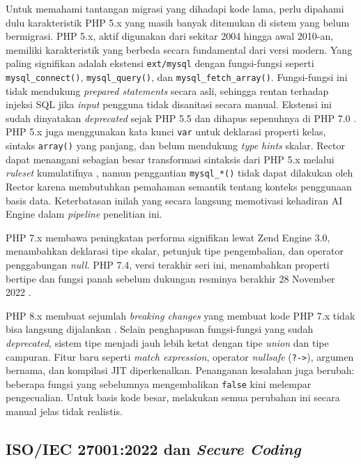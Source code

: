     Untuk memahami tantangan migrasi yang dihadapi kode lama, perlu dipahami dulu karakteristik PHP 5.x yang masih banyak ditemukan di sistem yang belum bermigrasi. PHP 5.x, aktif digunakan dari sekitar 2004 hingga awal 2010-an, memiliki karakteristik yang berbeda secara fundamental dari versi modern. Yang paling signifikan adalah ekstensi \texttt{ext/mysql} dengan fungsi-fungsi seperti \texttt{mysql\_connect()}, \texttt{mysql\_query()}, dan \texttt{mysql\_fetch\_array()}. Fungsi-fungsi ini tidak mendukung \textit{prepared statements} secara asli, sehingga rentan terhadap injeksi SQL jika \textit{input} pengguna tidak disanitasi secara manual. Ekstensi ini sudah dinyatakan \textit{deprecated} sejak PHP 5.5 dan dihapus sepenuhnya di PHP 7.0 \cite{phpgroup2022supported}. PHP 5.x juga menggunakan kata kunci \texttt{var} untuk deklarasi properti kelas, sintaks \texttt{array()} yang panjang, dan belum mendukung \textit{type hints} skalar. Rector dapat menangani sebagian besar transformasi sintaksis dari PHP 5.x melalui \textit{ruleset} kumulatifnya \cite{rector2024}, namun penggantian \texttt{mysql\_*()} tidak dapat dilakukan oleh Rector karena membutuhkan pemahaman semantik tentang konteks penggunaan basis data. Keterbatasan inilah yang secara langsung memotivasi kehadiran AI Engine dalam \textit{pipeline} penelitian ini.

    PHP 7.x membawa peningkatan performa signifikan lewat Zend Engine 3.0, menambahkan deklarasi tipe skalar, petunjuk tipe pengembalian, dan operator penggabungan \textit{null}. PHP 7.4, versi terakhir seri ini, menambahkan properti bertipe dan fungsi panah sebelum dukungan resminya berakhir 28 November 2022 \cite{phpgroup2022supported}.

    PHP 8.x membuat sejumlah \textit{breaking changes} yang membuat kode PHP 7.x tidak bisa langsung dijalankan \cite{phpgroup2022supported}. Selain penghapusan fungsi-fungsi yang sudah \textit{deprecated}, sistem tipe menjadi jauh lebih ketat dengan tipe \textit{union} dan tipe campuran. Fitur baru seperti \textit{match expression}, operator \textit{nullsafe} (\texttt{?->}), argumen bernama, dan kompilasi JIT diperkenalkan. Penanganan kesalahan juga berubah: beberapa fungsi yang sebelumnya mengembalikan \texttt{false} kini melempar pengecualian. Untuk basis kode besar, melakukan semua perubahan ini secara manual jelas tidak realistis.

    \subsection{ISO/IEC 27001:2022 dan \textit{Secure Coding}}

